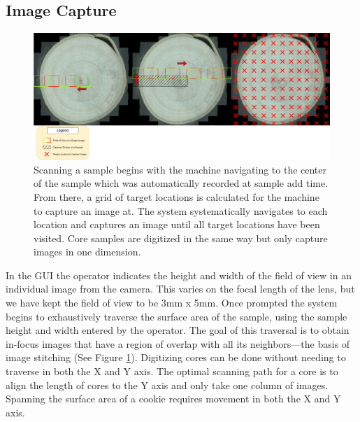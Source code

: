 \documentclass[a4paper,12pt]{article}
\begin{document}
\subsection{Image Capture}  
\begin{figure}
  \centering
  \includegraphics[height=0.4\linewidth]{../content/cookie_traverse.png}
  \caption{Scanning a sample begins with the machine navigating to the center of the sample which was automatically recorded at sample add time. From there, a grid of target locations is calculated for the machine to capture an image at. The system systematically navigates to each location and captures an image until all target locations have been visited. Core samples are digitized in the same way but only capture images in one dimension.}
  \label{fig:cookie_traverse}
\end{figure}

In the GUI the operator indicates the height and width of the field of view in an individual image from the camera. 
This varies on the focal length of the lens, but we have kept the field of view to be 3mm x 5mm. 
Once prompted the system begins to exhaustively traverse the surface area of the sample, using the sample height and width entered by the operator.  
The goal of this traversal is to obtain in-focus images that have a region of overlap with all its neighbors---the basis of image stitching (See Figure \ref{fig:cookie_traverse}). 
Digitizing cores can be done without needing to traverse in both the X and Y axis. 
The optimal scanning path for a core is to align the length of cores to the Y axis and only take one column of images.
Spanning the surface area of a cookie requires movement in both the X and Y axis.
\end{document}
